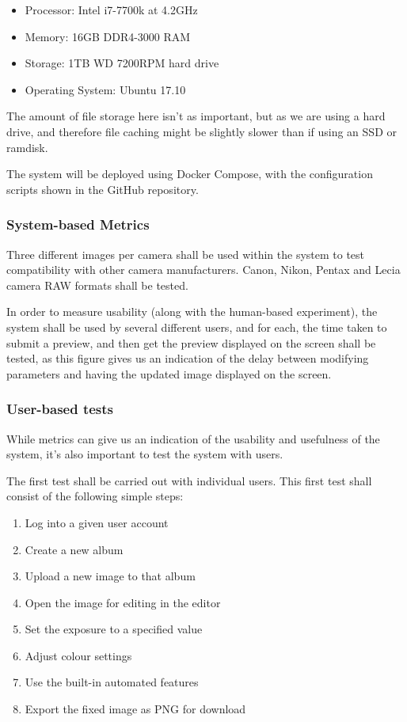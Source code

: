 \documentclass[12pt,a4paper]{article}
\begin{document}
\begin{itemize}
  \item Processor: Intel i7-7700k at 4.2GHz
  \item Memory: 16GB DDR4-3000 RAM
  \item Storage: 1TB WD 7200RPM hard drive
  \item Operating System: Ubuntu 17.10
\end{itemize}

The amount of file storage here isn't as important, but as we are using a hard drive, and therefore file caching might be slightly slower than if using an SSD or ramdisk.

The system will be deployed using Docker Compose, with the configuration scripts shown in the GitHub
repository.

\subsubsection{System-based Metrics}
Three different images per camera shall be used within the system to test compatibility with other camera manufacturers. Canon, Nikon, Pentax and Lecia camera RAW formats shall be tested.

In order to measure usability (along with the human-based experiment), the system shall be used by
several different users, and for each, the time taken to submit a preview, and then get the preview displayed
on the screen shall be tested, as this figure gives us an indication of the delay between modifying parameters
and having the updated image displayed on the screen.

\subsubsection{User-based tests}
While metrics can give us an indication of the usability and usefulness of the system, it's also important to test the system with users.

The first test shall be carried out with individual users. This first test shall consist of the following simple steps:

\begin{enumerate}
  \item Log into a given user account
  \item Create a new album
  \item Upload a new image to that album
  \item Open the image for editing in the editor
  \item Set the exposure to a specified value
  \item Adjust colour settings
  \item Use the built-in automated features
  \item Export the fixed image as PNG for download
\end{enumerate}
\end{document}
